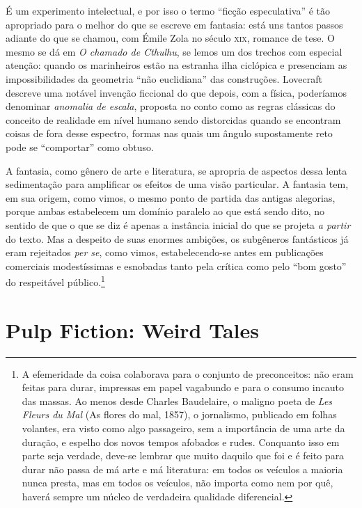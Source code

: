 É um experimento intelectual, e por isso o termo ``ficção
especulativa'' é tão apropriado para o melhor do que se escreve em
fantasia: está uns tantos passos adiante do que se chamou, com Émile
Zola no século \textsc{xix}, romance de tese. O mesmo se dá em \emph{O chamado
de Cthulhu}, se lemos um dos trechos com especial atenção: quando os marinheiros estão na estranha ilha ciclópica e presenciam as
impossibilidades da geometria ``não euclidiana'' das construções.
Lovecraft descreve uma notável invenção ficcional do que depois, com a
física, poderíamos denominar \emph{anomalia de escala}, proposta no
conto como as regras clássicas do conceito de realidade em nível humano
sendo distorcidas quando se encontram coisas de fora desse espectro,
formas nas quais um ângulo supostamente reto pode se ``comportar'' como
obtuso.

A fantasia, como gênero de arte e literatura, se apropria de aspectos
dessa lenta sedimentação para amplificar os efeitos de uma visão
particular. A fantasia tem, em sua origem, como vimos, o mesmo ponto de
partida das antigas alegorias, porque ambas estabelecem um domínio
paralelo ao que está sendo dito, no sentido de que o que se diz é apenas
a instância inicial do que se projeta \emph{a partir} do texto. Mas a
despeito de suas enormes ambições, os subgêneros fantásticos já eram
rejeitados \emph{per se}, como vimos, estabelecendo-se antes em
publicações comerciais modestíssimas e esnobadas tanto pela crítica como
pelo ``bom gosto'' do respeitável público.\footnote{A efemeridade da
  coisa colaborava para o conjunto de preconceitos: não eram feitas para
  durar, impressas em papel vagabundo e para o consumo incauto das
  massas. Ao menos desde Charles Baudelaire, o maligno poeta
  de \emph{Les Fleurs du Mal} (As flores do mal, 1857), o jornalismo, publicado em folhas volantes,
  era visto como algo passageiro, sem a importância de uma arte da
  duração, e espelho dos novos tempos afobados e rudes. Conquanto isso
  em parte seja verdade, deve-se lembrar que muito daquilo que foi e é
  feito para durar não passa de má arte e má literatura: em todos os
  veículos a maioria nunca presta, mas em todos os veículos, não importa
  como nem por quê, haverá sempre um núcleo de verdadeira qualidade
  diferencial.}

\section{Pulp Fiction: Weird Tales}

